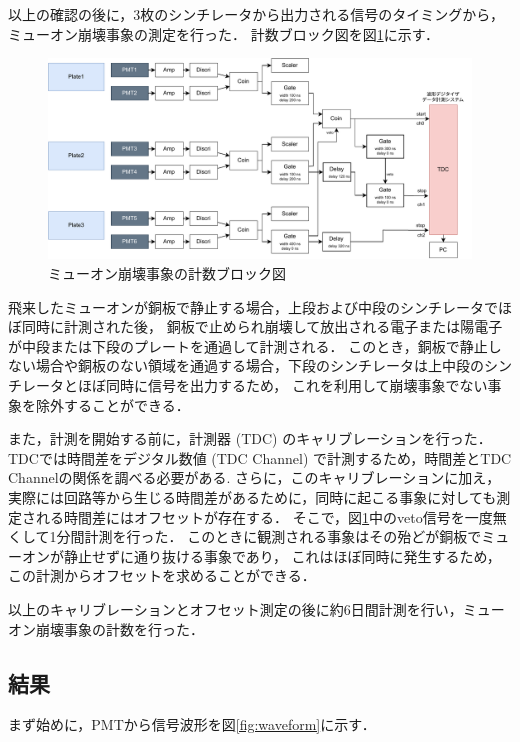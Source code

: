 \documentclass[uplatex,dvipdfmx,a4j,12pt]{jsarticle}
\begin{document}
以上の確認の後に，3枚のシンチレータから出力される信号のタイミングから，ミューオン崩壊事象の測定を行った．
計数ブロック図を図\ref{fig:block}に示す．
\begin{figure}[H]
  \centering
  \includegraphics[width=0.95\linewidth]{img/block.pdf}
  \caption{ミューオン崩壊事象の計数ブロック図}
  \label{fig:block}
\end{figure}
飛来したミューオンが銅板で静止する場合，上段および中段のシンチレータでほぼ同時に計測された後，
銅板で止められ崩壊して放出される電子または陽電子が中段または下段のプレートを通過して計測される．
このとき，銅板で静止しない場合や銅板のない領域を通過する場合，下段のシンチレータは上中段のシンチレータとほぼ同時に信号を出力するため，
これを利用して崩壊事象でない事象を除外することができる．

また，計測を開始する前に，計測器 (TDC) のキャリブレーションを行った．
TDCでは時間差をデジタル数値 (TDC Channel) で計測するため，時間差とTDC Channelの関係を調べる必要がある.
さらに，このキャリブレーションに加え，実際には回路等から生じる時間差があるために，同時に起こる事象に対しても測定される時間差にはオフセットが存在する．
そこで，図\ref{fig:block}中のveto信号を一度無くして1分間計測を行った．
このときに観測される事象はその殆どが銅板でミューオンが静止せずに通り抜ける事象であり，
これはほぼ同時に発生するため，この計測からオフセットを求めることができる．

以上のキャリブレーションとオフセット測定の後に約6日間計測を行い，ミューオン崩壊事象の計数を行った．

\subsection{結果}
まず始めに，PMTから信号波形を図\ref{fig:waveform}に示す．
\end{document}
